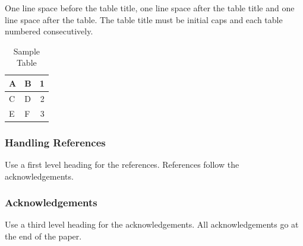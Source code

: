 \documentclass[a4paper]{article}
\begin{document}
One line space before the table title, one line space after the table
title and one line space after the table. The table title must be
initial caps and each table numbered consecutively.

\begin{table}[ht]
\begin{center}
\caption{Sample Table}

\bigskip

\begin{tabular}{|l|l|r|}
\hline
A & B & 1\\ \hline
C & D & 2\\
E & F & 3\\ \hline
\end{tabular}
\end{center}
\end{table}


\subsubsection{Handling References}

Use a first level heading for the references. References follow the
acknowledgements.


\subsubsection{Acknowledgements}

Use a third level heading for the acknowledgements. All acknowledgements
go at the end of the paper.




 

\end{document}
